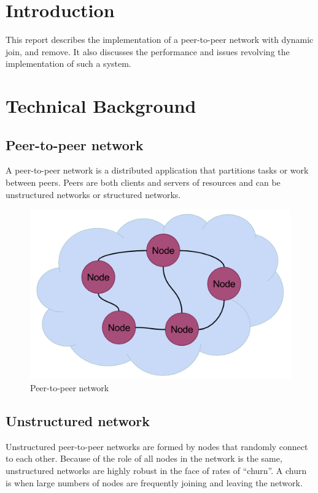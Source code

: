 \section{Introduction}

This report describes the implementation of a peer-to-peer network with dynamic join, and remove. It also discusses the performance and issues revolving the implementation of such a system.

\section{Technical Background}

\subsection{Peer-to-peer network} 
A peer-to-peer network is a distributed application that partitions tasks or work between peers. Peers are both clients and servers of resources and can be unstructured networks or structured networks. \cite{wiki:p2p}

\begin{figure}[h]
\begin{center}
\includegraphics[scale=.6]
{p2p.png}
\end{center}
\caption{Peer-to-peer network }\label{fig:p2p}
\end{figure}

\subsection{Unstructured network}
Unstructured peer-to-peer networks are formed by nodes that randomly connect to each other. Because of the role of all nodes in the network is the same, unstructured networks are highly robust in the face of rates of “churn”. A churn is when large numbers of nodes are frequently joining and leaving the network. \cite{wiki:un}


